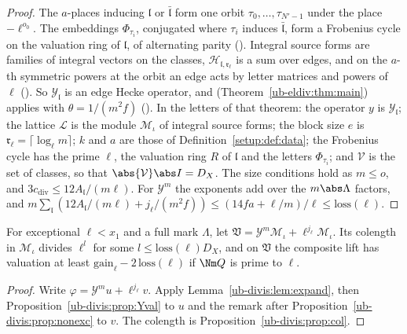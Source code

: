 \begin{proof}
The $a$-places inducing $\mathfrak l$ or $\bar{\mathfrak l}$ form one orbit $\tau_0,\dots,\tau_{N'-1}$
under the place $-\ell^{o_0}$. The embeddings $\Phi_{\tau_i}$, conjugated where $\tau_i$ induces
$\bar{\mathfrak l}$, form a Frobenius cycle on the valuation ring of $\mathfrak l$, of alternating
parity (). Integral source forms are families of
integral vectors on the classes, $\mathcal H_{\mathfrak l,\mathfrak r_\ell}$ is a sum over edges, and on the
$a$-th symmetric powers at the orbit an edge acts by letter matrices and powers of $\ell$
(). So $\mathcal Y_{\mathfrak l}$ is an edge Hecke operator,
and  (Theorem~\ref{ub-eldiv:thm:main}) applies with
$\theta=1/(m^2f)$ (). In
the letters of that theorem: the operator $y$ is $\mathcal Y_{\mathfrak l}$; the lattice $\mathcal L$
is the module $\mathcal M_\iota$ of integral source forms; the block size $e$ is
$\mathfrak r_\ell=\lceil\log_\ell m\rceil$; $k$ and $a$ are those of Definition~\ref{setup:def:data};
the Frobenius cycle has the prime $\ell$, the valuation ring $R$ of $\mathfrak l$ and the letters
$\Phi_{\tau_i}$; and $\mathcal V$ is the set of classes, so that $\abs{\mathcal V}\abs I=D_X$. The
size conditions hold as $m\le o$, and $3c_{\mathrm{div}}\le12A_{\mathfrak l}/(m\ell)$. For $\mathcal Y^m$ the exponents add over the $m\abs\Lambda$ factors, and
$m\sum_{\mathfrak l}(12A_{\mathfrak l}/(m\ell)+j_\ell/(m^2f))\le(14fa+\ell/m)/\ell\le\mathrm{loss}(\ell)$.
\end{proof}

\begin{proposition}
\label{ub-divis:prop:exc}
For exceptional $\ell<x_1$ and a full mark $\Lambda$, let $\mathfrak V=\mathcal Y^m\mathcal M_\iota+\ell^{j_\ell}\mathcal M_\iota$.
Its colength in $\mathcal M_\iota$ divides $\ell^l$ for some $l\le\mathrm{loss}(\ell)D_X$, and on $\mathfrak V$ the
composite lift has valuation at least $\mathrm{gain}_\ell-2\,\mathrm{loss}(\ell)$ if
$\Nm Q$ is prime to $\ell$.
\end{proposition}

\begin{proof}
Write $\varphi=\mathcal Y^mu+\ell^{j_\ell}v$. Apply Lemma~\ref{ub-divis:lem:expand}, then
Proposition~\ref{ub-divis:prop:Yval} to $u$ and the remark after
Proposition~\ref{ub-divis:prop:nonexc} to $v$. The colength is Proposition~\ref{ub-divis:prop:col}.
\end{proof}

